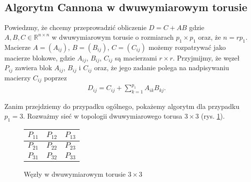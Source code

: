 
\subsection{Algorytm Cannona w dwuwymiarowym torusie}
Powiedzmy, że chcemy przeprowadzić obliczenie \(D = C + AB\) gdzie \(A, B, C\in\mathbb{R}^{n\times n}\) w dwuwymiarowym torusie o rozmiarach \(p_1 \times p_1\) oraz, że \(n=rp_1\). Macierze \(A=(A_{ij})\), \(B=(B_{ij})\), \(C=(C_{ij})\) możemy rozpatrywać jako macierze blokowe, gdzie \(A_{ij}\), \(B_{ij}\), \(C_{ij}\) są macierzami \(r\times r\). Przyjmijmy, że węzeł \(P_{ij}\) zawiera blok \(A_{ij}\), \(B_{ij}\) i \(C_{ij}\) oraz, że jego zadanie polega na nadpisywaniu macierzy \(C_{ij}\) poprzez
\begin{align*}
D_{ij}=C_{ij} + \sum_{k=1}^{p_1} A_{ik}B_{kj}.
\end{align*}

Zanim przejdziemy do przypadku ogólnego, pokażemy algorytm dla przypadku \(p_1 = 3\). Rozważmy sieć w topologii dwuwymiarowego torusa \(3\times 3\) (rys. \ref{fig:cannon_torus1}).

\begin{figure}[h]
\centering
\begin{tabular}{|C{1.5cm}|C{1.5cm}|C{1.5cm}|}
\hline
\(P_{11}\) & \(P_{12}\) & \(P_{13}\) \\
\hline
\(P_{21}\) & \(P_{22}\) & \(P_{23}\) \\
\hline
\(P_{31}\) & \(P_{32}\) & \(P_{33}\) \\
\hline
\end{tabular}
\caption{Węzły w dwuwymiarowym torusie \(3\times 3\)}
\label{fig:cannon_torus1}
\end{figure}


